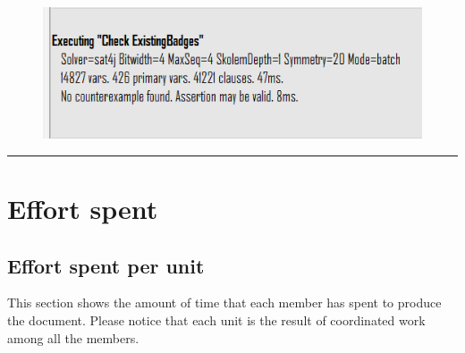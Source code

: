\documentclass{Configuration_Files/Template}
\begin{document}
\begin{figure}[H]
\includegraphics[scale = 0.7]{Images/Alloy/3Outcome.png}\\
\centering
\end{figure}

{\color{bluepoli}\rule{\linewidth}{0.1pt}}


\chapter{Effort spent}
\section{Effort spent per unit}

This section shows the amount of time that each member has spent to produce the document. Please notice that each unit is the result of coordinated work among all the members.
\end{document}
